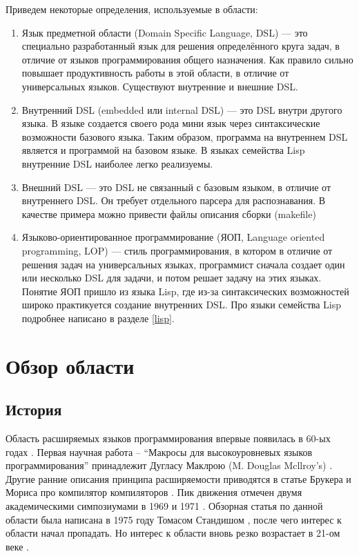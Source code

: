 \documentclass[a4paper,12pt,titlepage]{extarticle}
\begin{document}
Приведем некоторые определения, используемые в области:
\begin{enumerate}
  \item Язык предметной области (Domain Specific Language, DSL) --- это
  специально разработанный язык для решения определённого круга задач, в
  отличие от языков программирования общего назначения. Как правило
  сильно повышает продуктивность работы в этой области, в отличие от
  универсальных языков. Существуют внутренние и внешние DSL.
  \item Внутренний DSL (embedded или internal DSL) --- это DSL внутри другого
  языка. В языке создается своего рода мини язык через синтаксические
  возможности базового языка. Таким образом, программа на внутреннем DSL
  является и программой на базовом языке. В языках семейства Lisp внутренние
  DSL наиболее легко реализуемы.
  \item Внешний DSL --- это DSL не связанный с базовым языком, в отличие от
  внутреннего DSL. Он требует отдельного парсера для распознавания. В качестве
  примера можно привести файлы описания сборки (makefile)
  \item Языково-ориентированное программирование (ЯОП, Language oriented
  programming, LOP) --- стиль программирования, в котором в отличие от решения
  задач на универсальных языках, программист сначала создает один или несколько
  DSL для задачи, и потом решает задачу на этих языках. Понятие ЯОП пришло из
  языка Lisp, где из-за синтаксических возможностей широко практикуется
  создание внутренних DSL. Про языки семейства Lisp подробнее написано в
  разделе \ref{lisp}.
\end{enumerate}

\section{Обзор области}

\subsection{История}
\label{hist}
Область расширяемых языков программирования впервые появилась в 60-ых годах
\cite{hist69}. Первая научная работа -- ``Макросы для высокоуровневых языков
программирования'' принадлежит Дугласу Маклрою (M. Douglas Mcllroy's)
\cite{macro60}. Другие ранние описания принципа расширяемости приводятся в
статье Брукера и Мориса про компилятор компиляторов \cite{cc60}.
Пик движения отмечен двумя академическими симпозиумами в 1969 \cite{proc69} и 1971
\cite{proc71}. Обзорная статья по данной области была написана в 1975 году
Томасом Стандишом \cite{Stan75}, после чего интерес к области начал пропадать.
Но интерес к области вновь резко возрастает в 21-ом веке \cite{Ext2105}.
\end{document}
